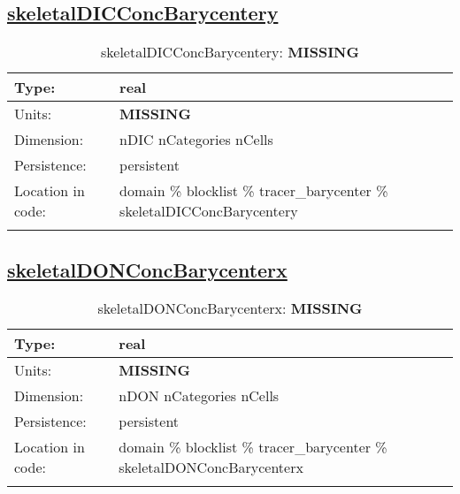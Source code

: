 \subsection[skeletalDICConcBarycentery]{\hyperref[sec:var_tab_tracer_barycenter]{skeletalDICConcBarycentery}}
\label{subsec:var_sec_tracer_barycenter_skeletalDICConcBarycentery}
\begin{center}
\begin{longtable}{| p{2.0in} | p{4.0in} |}
        \hline 
        Type: & real \\
        \hline 
        Units: & {\bf \color{red} MISSING} \\
        \hline 
        Dimension: & nDIC nCategories nCells \\
        \hline 
        Persistence: & persistent \\
        \hline 
         Location in code: & domain \% blocklist \% tracer\_barycenter \% skeletalDICConcBarycentery \\
         \hline 
    \caption{skeletalDICConcBarycentery: {\bf \color{red} MISSING}}
\end{longtable}
\end{center}
\subsection[skeletalDONConcBarycenterx]{\hyperref[sec:var_tab_tracer_barycenter]{skeletalDONConcBarycenterx}}
\label{subsec:var_sec_tracer_barycenter_skeletalDONConcBarycenterx}
\begin{center}
\begin{longtable}{| p{2.0in} | p{4.0in} |}
        \hline 
        Type: & real \\
        \hline 
        Units: & {\bf \color{red} MISSING} \\
        \hline 
        Dimension: & nDON nCategories nCells \\
        \hline 
        Persistence: & persistent \\
        \hline 
         Location in code: & domain \% blocklist \% tracer\_barycenter \% skeletalDONConcBarycenterx \\
         \hline 
    \caption{skeletalDONConcBarycenterx: {\bf \color{red} MISSING}}
\end{longtable}
\end{center}
